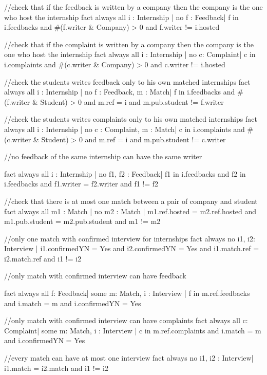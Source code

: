 \documentclass{article}
\begin{document}
\begin{spverbatim}
//check that if the feedback is written by a company then the company is the one who host the internship
fact {
    always all i : Internship | no f : Feedback|
        f in i.feedbacks and #(f.writer & Company) > 0 and f.writer != i.hosted
}

//check that if the complaint is written by a company then the company is the one who host the internship
fact {
    always all i : Internship | no c: Complaint|
        c in i.complaints and #(c.writer & Company) > 0 and c.writer != i.hosted
}

//check the students writes feedback only to his own matched internships
fact {
    always all i : Internship | no f : Feedback,  m : Match|
        f in i.feedbacks and #(f.writer & Student) > 0 and m.ref = i and m.pub.student != f.writer
}

//check the students writes complaints only to his own matched internships
fact {
    always all i : Internship | no c : Complaint,  m : Match|
        c in i.complaints and #(c.writer & Student) > 0 and m.ref = i and m.pub.student != c.writer
}

//no feedback of the same internship can have the same writer 

fact {
    always all i : Internship | no f1, f2 : Feedback| 
        f1 in i.feedbacks and f2 in i.feedbacks and f1.writer = f2.writer and f1 != f2
}


//check that there is at most one match between a pair of company and student
fact {
    always all m1 : Match | no m2 : Match |
       m1.ref.hosted = m2.ref.hosted and m1.pub.student = m2.pub.student and m1 != m2
}

//only one match with confirmed interview for internships
fact {
    always no i1, i2: Interview |
        i1.confirmedYN = Yes and i2.confirmedYN = Yes and i1.match.ref = i2.match.ref and i1 != i2
}

//only match with confirmed interview can have feedback

fact {
    always all f: Feedback| some m: Match, i : Interview |
        f in m.ref.feedbacks and i.match = m and i.confirmedYN = Yes 
}


//only match with confirmed interview can have complaints
fact {
    always all c: Complaint| some m: Match, i : Interview |
        c in m.ref.complaints and i.match = m and i.confirmedYN = Yes
}


//every match can have at most one interview
fact {
    always no i1, i2 : Interview|
        i1.match = i2.match and i1 != i2
}


\end{spverbatim}
\end{document}
